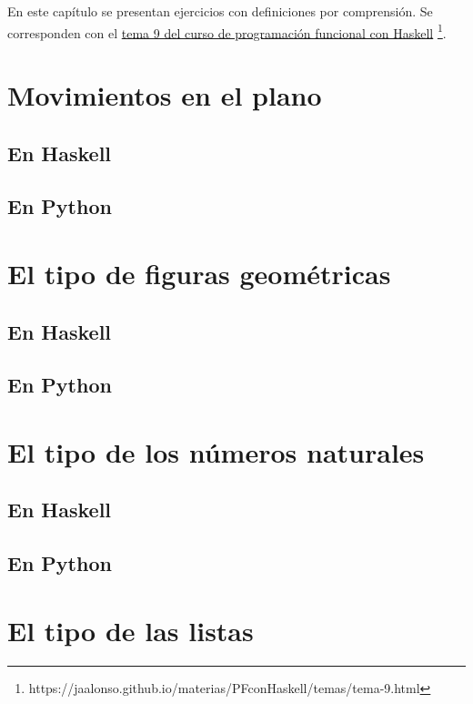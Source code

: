 \documentclass[a4paper,12pt,twoside]{book}
\begin{document}
En este capítulo se presentan ejercicios con definiciones por
comprensión. Se corresponden con el
\href{https://jaalonso.github.io/materias/PFconHaskell/temas/tema-9.html}
{tema 9 del curso de programación funcional con Haskell}
\footnote{https://jaalonso.github.io/materias/PFconHaskell/temas/tema-9.html}.

\minitoc

\section{Movimientos en el plano}
\subsection*{En Haskell}
\subsection*{En Python}

\section{El tipo de figuras geométricas}
\subsection*{En Haskell}
\subsection*{En Python}

\section{El tipo de los números naturales}
\subsection*{En Haskell}
\subsection*{En Python}

\section{El tipo de las listas}
\end{document}
